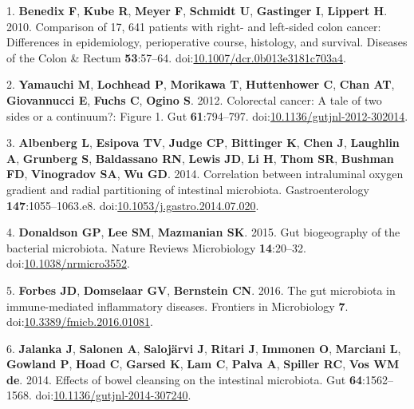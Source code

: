 \documentclass[11pt,]{article}
\begin{document}
\hypertarget{refs}{}
\hypertarget{ref-Benedix2010}{}
1. \textbf{Benedix F}, \textbf{Kube R}, \textbf{Meyer F},
\textbf{Schmidt U}, \textbf{Gastinger I}, \textbf{Lippert H}. 2010.
Comparison of 17, 641 patients with right- and left-sided colon cancer:
Differences in epidemiology, perioperative course, histology, and
survival. Diseases of the Colon \& Rectum \textbf{53}:57--64.
doi:\href{https://doi.org/10.1007/dcr.0b013e3181c703a4}{10.1007/dcr.0b013e3181c703a4}.

\hypertarget{ref-Yamauchi2012}{}
2. \textbf{Yamauchi M}, \textbf{Lochhead P}, \textbf{Morikawa T},
\textbf{Huttenhower C}, \textbf{Chan AT}, \textbf{Giovannucci E},
\textbf{Fuchs C}, \textbf{Ogino S}. 2012. Colorectal cancer: A tale of
two sides or a continuum?: Figure 1. Gut \textbf{61}:794--797.
doi:\href{https://doi.org/10.1136/gutjnl-2012-302014}{10.1136/gutjnl-2012-302014}.

\hypertarget{ref-Albenberg2014}{}
3. \textbf{Albenberg L}, \textbf{Esipova TV}, \textbf{Judge CP},
\textbf{Bittinger K}, \textbf{Chen J}, \textbf{Laughlin A},
\textbf{Grunberg S}, \textbf{Baldassano RN}, \textbf{Lewis JD},
\textbf{Li H}, \textbf{Thom SR}, \textbf{Bushman FD}, \textbf{Vinogradov
SA}, \textbf{Wu GD}. 2014. Correlation between intraluminal oxygen
gradient and radial partitioning of intestinal microbiota.
Gastroenterology \textbf{147}:1055--1063.e8.
doi:\href{https://doi.org/10.1053/j.gastro.2014.07.020}{10.1053/j.gastro.2014.07.020}.

\hypertarget{ref-Donaldson2015}{}
4. \textbf{Donaldson GP}, \textbf{Lee SM}, \textbf{Mazmanian SK}. 2015.
Gut biogeography of the bacterial microbiota. Nature Reviews
Microbiology \textbf{14}:20--32.
doi:\href{https://doi.org/10.1038/nrmicro3552}{10.1038/nrmicro3552}.

\hypertarget{ref-Forbes2016}{}
5. \textbf{Forbes JD}, \textbf{Domselaar GV}, \textbf{Bernstein CN}.
2016. The gut microbiota in immune-mediated inflammatory diseases.
Frontiers in Microbiology \textbf{7}.
doi:\href{https://doi.org/10.3389/fmicb.2016.01081}{10.3389/fmicb.2016.01081}.

\hypertarget{ref-Jalanka2014}{}
6. \textbf{Jalanka J}, \textbf{Salonen A}, \textbf{Salojärvi J},
\textbf{Ritari J}, \textbf{Immonen O}, \textbf{Marciani L},
\textbf{Gowland P}, \textbf{Hoad C}, \textbf{Garsed K}, \textbf{Lam C},
\textbf{Palva A}, \textbf{Spiller RC}, \textbf{Vos WM de}. 2014. Effects
of bowel cleansing on the intestinal microbiota. Gut
\textbf{64}:1562--1568.
doi:\href{https://doi.org/10.1136/gutjnl-2014-307240}{10.1136/gutjnl-2014-307240}.
\end{document}
